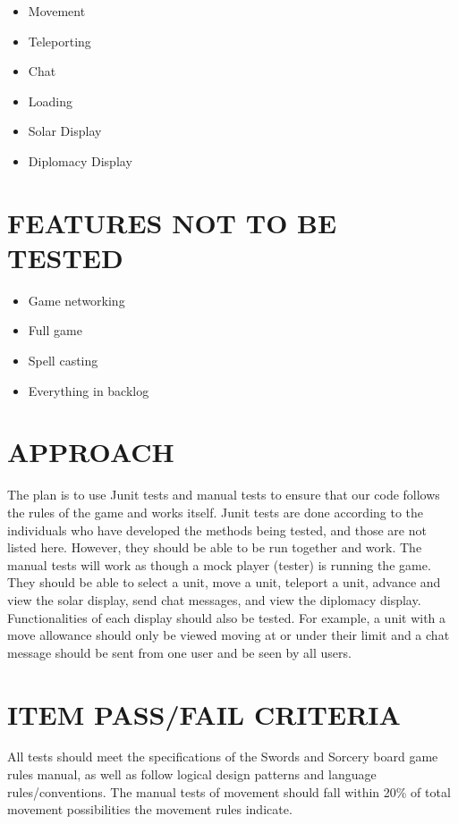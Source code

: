 {\color{black}
\begin{itemize}
\item Movement
\item Teleporting
\item Chat 
\item Loading
\item Solar Display
\item Diplomacy Display
\end{itemize}
}
\section[FEATURES NOT TO BE TESTED]{\bfseries\color{black}
	 FEATURES NOT TO BE TESTED}
{\color{black}
\begin{itemize}
\item Game networking
\item Full game
\item Spell casting
\item Everything in backlog
\end{itemize}
}

\section[APPROACH]{\bfseries\color{black} APPROACH}
{\color{black}
The plan is to use Junit tests and manual tests to ensure that our code follows the rules of the game and works itself. Junit tests are done according to the individuals who have developed the methods being tested, and those are not listed here. However, they should be able to be run together and work. The manual tests will work as though a mock player (tester) is running the game. They should be able to select a unit, move a unit, teleport a unit, advance and view the solar display, send chat messages, and view the diplomacy display. Functionalities of each display should also be tested. For example, a unit with a move allowance should only be viewed moving at or under their limit and a chat message should be sent from one user and be seen by all users.
}

\section[ITEM PASS/FAIL CRITERIA]{\bfseries\color{black}
	 ITEM PASS/FAIL CRITERIA}
{\color{black}
All tests should meet the specifications of the Swords and Sorcery board game rules manual, as well as follow logical design patterns and language rules/conventions. The manual tests of movement should fall within 20\% of total movement possibilities the movement rules indicate.
}

